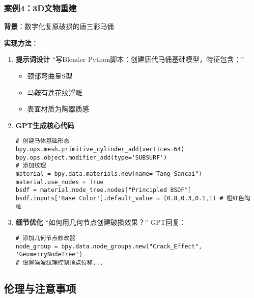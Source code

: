 \hypertarget{ux6848ux4f8b3ux5c06ux62cdux6444ux7684ux7167ux7247ux4feeux6539ux4e3aux52a8ux6f2bux98ceux683c}{%


\hypertarget{ux6848ux4f8b43dux6587ux7269ux91cdux5efa}{%
\subsubsection{案例4：3D文物重建}\label{ux6848ux4f8b43dux6587ux7269ux91cdux5efa}}

\textbf{背景}：数字化复原破损的唐三彩马俑

\textbf{实现方法}：

\begin{enumerate}
\def\labelenumi{\arabic{enumi}.}
\item
  \textbf{提示词设计} ``写Blender
  Python脚本：创建唐代马俑基础模型，特征包含：''

  \begin{itemize}
  
  \item
    颈部弯曲呈S型
  \item
    马鞍有莲花纹浮雕
  \item
    表面材质为陶器质感
  \end{itemize}
\item
  \textbf{GPT生成核心代码}

\begin{lstlisting}
# 创建马体基础形态
bpy.ops.mesh.primitive_cylinder_add(vertices=64)
bpy.ops.object.modifier_add(type='SUBSURF')
# 添加纹理
material = bpy.data.materials.new(name="Tang_Sancai")
material.use_nodes = True
bsdf = material.node_tree.nodes["Principled BSDF"]
bsdf.inputs['Base Color'].default_value = (0.8,0.3,0.1,1) # 橙红色陶釉
\end{lstlisting}
\item
  \textbf{细节优化} ``如何用几何节点创建破损效果？'' GPT回复：

\begin{lstlisting}
# 添加几何节点修改器
node_group = bpy.data.node_groups.new("Crack_Effect", 'GeometryNodeTree')
# 设置噪波纹理控制顶点位移...
\end{lstlisting}
\end{enumerate}



\hypertarget{ux4f26ux7406ux4e0eux6ce8ux610fux4e8bux9879}{%
\subsection{伦理与注意事项}\label{ux4f26ux7406ux4e0eux6ce8ux610fux4e8bux9879}}

}
